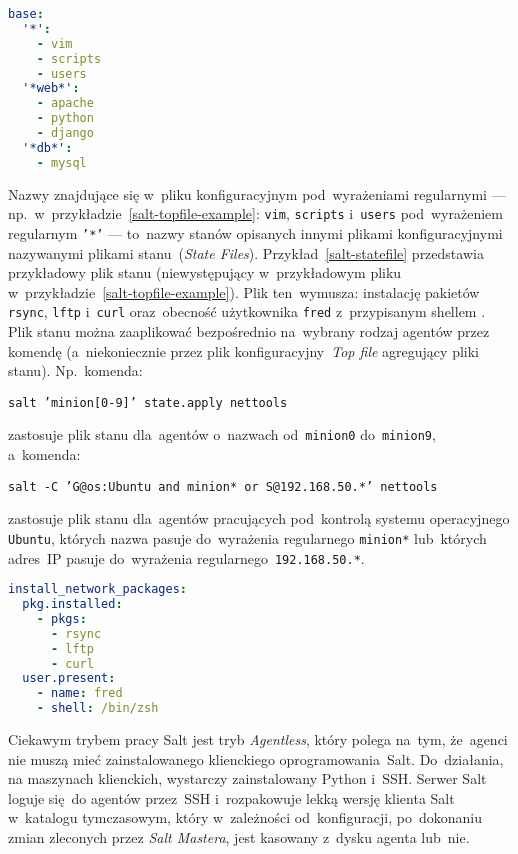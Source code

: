\documentclass[thesis]{subfiles}
\begin{document}
\begin{lstlisting}[numbers=none,language=yaml,caption={Plik konfiguracyjny \texttt{top.sls} w~formacie \texttt{YAML} definujący konfigurację dla~3~rodzajów agentów},label=salt-topfile-example]
base:
  '*':
    - vim
    - scripts
    - users
  '*web*':
    - apache
    - python
    - django
  '*db*':
    - mysql
\end{lstlisting}
Nazwy znajdujące się w~pliku konfiguracyjnym pod~wyrażeniami regularnymi --- np.~w~przykładzie~\ref{salt-topfile-example}: \texttt{vim}, \texttt{scripts} i~\texttt{users} pod~wyrażeniem regularnym \texttt{'*'} --- to~nazwy stanów opisanych innymi plikami konfiguracyjnymi nazywanymi plikami stanu~(\emph{State Files}). Przykład~\ref{salt-statefile} przedstawia przykładowy plik stanu  (niewystępujący w~przykładowym pliku~ w~przykładzie~\ref{salt-topfile-example}). Plik ten~wymusza: instalację pakietów \texttt{rsync}, \texttt{lftp} i~\texttt{curl} oraz~obecność użytkownika \texttt{fred} z~przypisanym shellem . Plik stanu można zaaplikować bezpośrednio na~wybrany rodzaj agentów przez komendę (a~niekoniecznie przez plik konfiguracyjny~\emph{Top file} agregujący pliki stanu). Np.~komenda:
\begin{center}
\texttt{salt 'minion[0-9]' state.apply nettools}
\end{center}
zastosuje plik stanu  dla~agentów o~nazwach od~\texttt{minion0} do~\texttt{minion9}, a~komenda:
\begin{center}
\texttt{salt -C 'G@os:Ubuntu and minion* or S@192.168.50.*' nettools}
\end{center}
zastosuje plik stanu  dla~agentów pracujących pod~kontrolą systemu operacyjnego \texttt{Ubuntu}, których nazwa pasuje do~wyrażenia regularnego \texttt{minion*} lub~których adres~IP pasuje do~wyrażenia regularnego~\texttt{192.168.50.*}.

\begin{lstlisting}[numbers=none,language=yaml,caption={Plik stanu \texttt{nettools.sls} definujący 3~pakiety, które agent ma~zainstalować oraz~użytkownika \texttt{fred}, który musi być w~systemie i~mieć przypisany shell~\texttt{/bin/zsh}},label=salt-statefile]
install_network_packages:
  pkg.installed:
    - pkgs:
      - rsync
      - lftp
      - curl
  user.present:
    - name: fred
    - shell: /bin/zsh
\end{lstlisting}

Ciekawym trybem pracy Salt jest tryb \emph{Agentless}, który polega na~tym, że~agenci nie muszą mieć zainstalowanego klienckiego oprogramowania~Salt. Do~działania, na maszynach klienckich, wystarczy zainstalowany Python i~SSH. Serwer Salt loguje się~do agentów przez~SSH i~rozpakowuje lekką wersję klienta Salt w~katalogu tymczasowym, który w~zależności od~konfiguracji, po~dokonaniu zmian zleconych przez \emph{Salt Mastera}, jest kasowany z~dysku agenta lub~nie.
\end{document}
